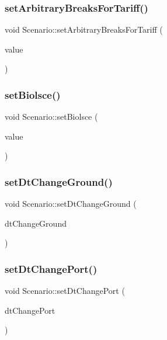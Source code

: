 \subsubsection{\texorpdfstring{setArbitraryBreaksForTariff()}{setArbitraryBreaksForTariff()}}
{\footnotesize\ttfamily void Scenario\+::set\+Arbitrary\+Breaks\+For\+Tariff (\begin{DoxyParamCaption}\item[{const Q\+String\+List \&}]{value }\end{DoxyParamCaption})}

\mbox{\label{class_scenario_ae503354991f933a8a7daf41cb14c47d8}} 
\subsubsection{\texorpdfstring{setBiolsce()}{setBiolsce()}}
{\footnotesize\ttfamily void Scenario\+::set\+Biolsce (\begin{DoxyParamCaption}\item[{const Q\+String \&}]{value }\end{DoxyParamCaption})}

\mbox{\label{class_scenario_a5c3714ea69e729f4269b5c2b3fb120e5}} 
\subsubsection{\texorpdfstring{setDtChangeGround()}{setDtChangeGround()}}
{\footnotesize\ttfamily void Scenario\+::set\+Dt\+Change\+Ground (\begin{DoxyParamCaption}\item[{const Q\+String \&}]{dt\+Change\+Ground }\end{DoxyParamCaption})}

\mbox{\label{class_scenario_a6209ebc754dd40d01aefa0bc95b9e67d}} 
\subsubsection{\texorpdfstring{setDtChangePort()}{setDtChangePort()}}
{\footnotesize\ttfamily void Scenario\+::set\+Dt\+Change\+Port (\begin{DoxyParamCaption}\item[{const Q\+String \&}]{dt\+Change\+Port }\end{DoxyParamCaption})}

